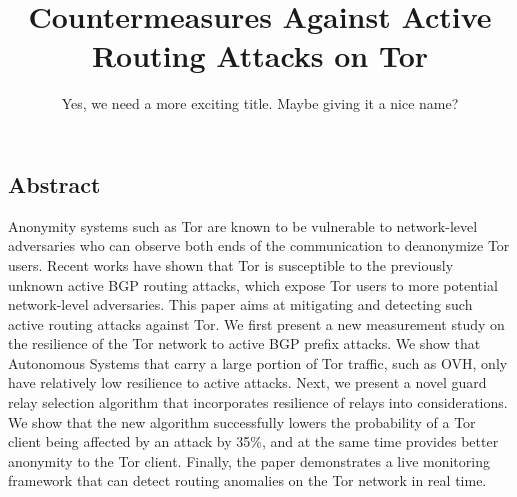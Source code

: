 \documentclass[letterpaper,twocolumn,10pt]{article}
\begin{document}
\date{}

\title{\Large \bf Countermeasures Against Active Routing Attacks on Tor}
\author{Yes, we need a more exciting title. Maybe giving it a nice name?}


\maketitle

\thispagestyle{empty}

\subsection*{Abstract}
Anonymity systems such as Tor are known to be vulnerable to network-level adversaries who can observe both ends of the communication to deanonymize Tor users. Recent works have shown that Tor is susceptible to the previously unknown active BGP routing attacks, which expose Tor users to more potential network-level adversaries. This paper aims at mitigating and detecting such active routing attacks against Tor. We first present a new measurement study on the resilience of the Tor network to active BGP prefix attacks. We show that Autonomous Systems that carry a large portion of Tor traffic, such as OVH, only have relatively low resilience to active attacks. Next, we present a novel guard relay selection algorithm that incorporates resilience of relays into considerations. We show that the new algorithm successfully lowers the probability of a Tor client being affected by an attack by 35\%, and at the same time provides better anonymity to the Tor client. Finally, the paper demonstrates a live monitoring framework that can detect routing anomalies on the Tor network in real time. 








%
%


{\footnotesize 
}

\end{document}
